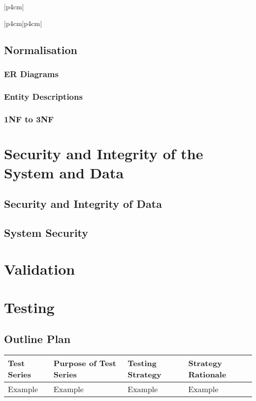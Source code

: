 \begin{center}
\begin{tabular}{|p{4cm}|}
\begin{center}
\begin{tabular}{|p{4cm}|p{4cm}|}
\subsection{Normalisation}

\subsubsection{ER Diagrams}

\subsubsection{Entity Descriptions}

\subsubsection{1NF to 3NF}

\section{Security and Integrity of the System and Data}

\subsection{Security and Integrity of Data}

\subsection{System Security}

\section{Validation}

\section{Testing}

\begin{landscape}
\subsection{Outline Plan}

\begin{center}
    \begin{tabular}{|p{2cm}|p{5cm}|p{5cm}|p{4cm}|}
        \hline
        \textbf{Test Series} & \textbf{Purpose of Test Series} & \textbf{Testing Strategy} & \textbf{Strategy Rationale}\\ \hline
        Example & Example & Example & Example \\ \hline
    \end{tabular}
\end{center}


\end{landscape}
\end{tabular}
\end{center}
\end{tabular}
\end{center}
